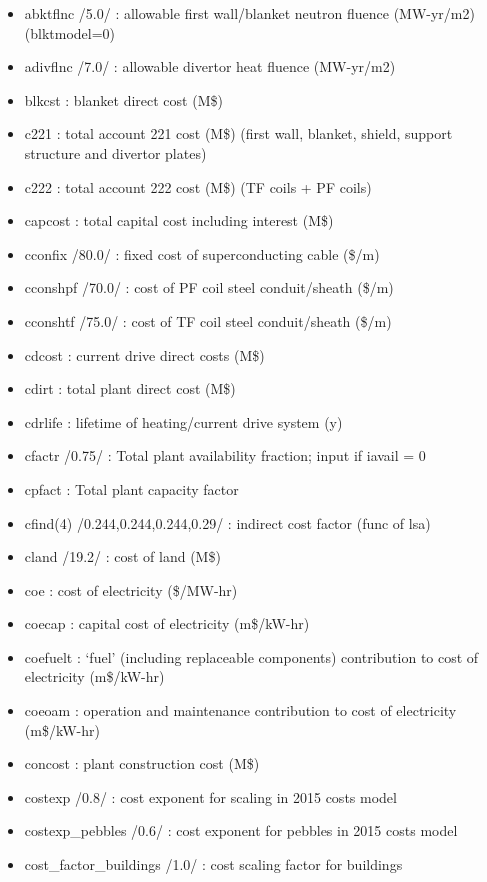 \documentclass[]{article}
\providecommand{\tightlist}{%
  \setlength{\itemsep}{0pt}\setlength{\parskip}{0pt}}
\begin{document}
\begin{itemize}
\tightlist
\item
  abktflnc /5.0/ : allowable first wall/blanket neutron fluence
  (MW-yr/m2) (blktmodel=0)
\item
  adivflnc /7.0/ : allowable divertor heat fluence (MW-yr/m2)
\item
  blkcst : blanket direct cost (M\$)
\item
  c221 : total account 221 cost (M\$) (first wall, blanket, shield,
  support structure and divertor plates)
\item
  c222 : total account 222 cost (M\$) (TF coils + PF coils)
\item
  capcost : total capital cost including interest (M\$)
\item
  cconfix /80.0/ : fixed cost of superconducting cable (\$/m)
\item
  cconshpf /70.0/ : cost of PF coil steel conduit/sheath (\$/m)
\item
  cconshtf /75.0/ : cost of TF coil steel conduit/sheath (\$/m)
\item
  cdcost : current drive direct costs (M\$)
\item
  cdirt : total plant direct cost (M\$)
\item
  cdrlife : lifetime of heating/current drive system (y)
\item
  cfactr /0.75/ : Total plant availability fraction; input if iavail = 0
\item
  cpfact : Total plant capacity factor
\item
  cfind(4) /0.244,0.244,0.244,0.29/ : indirect cost factor (func of lsa)
\item
  cland /19.2/ : cost of land (M\$)
\item
  coe : cost of electricity (\$/MW-hr)
\item
  coecap : capital cost of electricity (m\$/kW-hr)
\item
  coefuelt : `fuel' (including replaceable components) contribution to
  cost of electricity (m\$/kW-hr)
\item
  coeoam : operation and maintenance contribution to cost of electricity
  (m\$/kW-hr)
\item
  concost : plant construction cost (M\$)
\item
  costexp /0.8/ : cost exponent for scaling in 2015 costs model
\item
  costexp\_pebbles /0.6/ : cost exponent for pebbles in 2015 costs model
\item
  cost\_factor\_buildings /1.0/ : cost scaling factor for buildings

\end{itemize}
\end{document}

